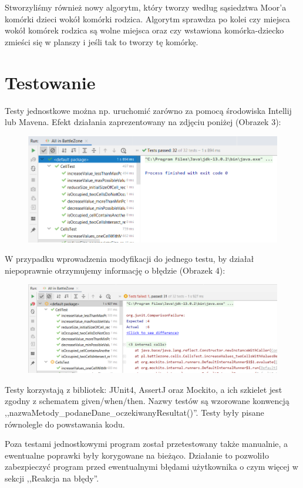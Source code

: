 \documentclass{article}
\begin{document}
Stworzyliśmy również nowy algorytm, który tworzy według sąsiedztwa Moor'a komórki dzieci wokół komórki rodzica. Algorytm sprawdza po kolei czy miejsca wokół komórek rodzica są wolne miejsca oraz czy wstawiona komórka-dziecko zmieści się w planszy i jeśli tak to tworzy tę komórkę.

\section{Testowanie}
Testy jednostkowe można np. uruchomić zarówno za pomocą środowiska Intellij lub Mavena.
Efekt działania zaprezentowany na zdjęciu poniżej (Obrazek 3):
\begin{figure} [hbt!]
    \centering
    \includegraphics[width=12cm]{Uruchominie_testow.png}
\end{figure}

W przypadku wprowadzenia modyfikacji do jednego testu, by działał niepoprawnie otrzymujemy informację o błędzie (Obrazek 4):
\begin{figure} [hbt!]
    \centering
    \includegraphics[width=12cm]{bledne_testy.png}
\end{figure}

Testy korzystają z bibliotek: JUnit4, AssertJ oraz Mockito, a ich szkielet jest zgodny z schematem given/when/then. Nazwy testów są wzorowane konwencją ,,nazwaMetody\_podaneDane\_oczekiwanyResultat()''. 
Testy były pisane równolegle do powstawania kodu.

Poza testami jednostkowymi program został przetestowany także manualnie, a ewentualne poprawki były korygowane na bieżąco. Działanie to pozwoliło zabezpieczyć program przed ewentualnymi błędami użytkownika o czym więcej w sekcji ,,Reakcja na błędy''.
\newpage
\end{document}
